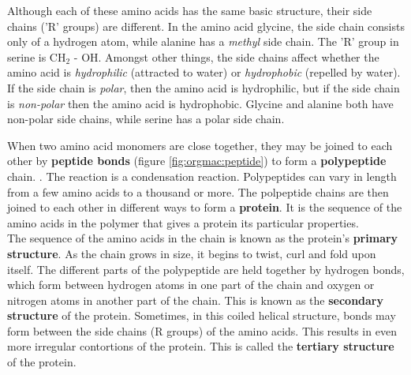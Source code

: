 Although each of these amino acids has the same basic structure, their side chains ('R' groups) are different. In the amino acid glycine, the side chain consists only of a hydrogen atom, while alanine has a \textit{methyl} side chain. The 'R' group in serine is CH$_{2}$ - OH. Amongst other things, the side chains affect whether the amino acid is \textit{hydrophilic} (attracted to water) or \textit{hydrophobic} (repelled by water). If the side chain is \textit{polar}, then the amino acid is hydrophilic, but if the side chain is \textit{non-polar} then the amino acid is hydrophobic. Glycine and alanine both have non-polar side chains, while serine has a polar side chain.


When two amino acid monomers are close together, they may be joined to each other by \textbf{peptide bonds} (figure \ref{fig:orgmac:peptide}) to form a \textbf{polypeptide} chain. . The reaction is a condensation reaction. Polypeptides can vary in length from a few amino acids to a thousand or more. The polpeptide chains are then joined to each other in different ways to form a \textbf{protein}. It is the sequence of the amino acids in the polymer that gives a protein its particular properties.\\

The sequence of the amino acids in the chain is known as the protein's \textbf{primary structure}. As the chain grows in size, it begins to twist, curl and fold upon itself. The different parts of the polypeptide are held together by hydrogen bonds, which form between hydrogen atoms in one part of the chain and oxygen or nitrogen atoms in another part of the chain. This is known as the \textbf{secondary structure} of the protein. Sometimes, in this coiled helical structure, bonds may form between the side chains (R groups) of the amino acids. This results in even more irregular contortions of the protein. This is called the \textbf{tertiary structure} of the protein.\\

